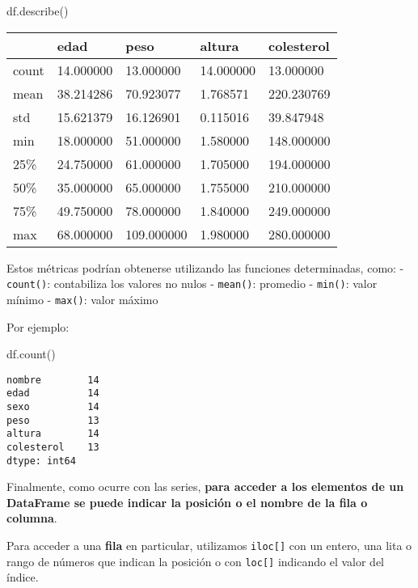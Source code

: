 \documentclass[
  letterpaper,
  DIV=11,
  numbers=noendperiod]{scrreprt}
\newenvironment{Shaded}{\begin{snugshade}}{\end{snugshade}}
\newcommand{\NormalTok}[1]{\textcolor[rgb]{0.00,0.23,0.31}{#1}}
\begin{document}
\begin{Shaded}
\begin{Highlighting}[]
\NormalTok{df.describe()}
\end{Highlighting}
\end{Shaded}

\begin{longtable}[]{@{}lllll@{}}
\toprule\noalign{}
& edad & peso & altura & colesterol \\
\midrule\noalign{}
\endhead
\bottomrule\noalign{}
\endlastfoot
count & 14.000000 & 13.000000 & 14.000000 & 13.000000 \\
mean & 38.214286 & 70.923077 & 1.768571 & 220.230769 \\
std & 15.621379 & 16.126901 & 0.115016 & 39.847948 \\
min & 18.000000 & 51.000000 & 1.580000 & 148.000000 \\
25\% & 24.750000 & 61.000000 & 1.705000 & 194.000000 \\
50\% & 35.000000 & 65.000000 & 1.755000 & 210.000000 \\
75\% & 49.750000 & 78.000000 & 1.840000 & 249.000000 \\
max & 68.000000 & 109.000000 & 1.980000 & 280.000000 \\
\end{longtable}

Estos métricas podrían obtenerse utilizando las funciones determinadas,
como: - \texttt{count()}: contabiliza los valores no nulos -
\texttt{mean()}: promedio - \texttt{min()}: valor mínimo -
\texttt{max()}: valor máximo

Por ejemplo:

\begin{Shaded}
\begin{Highlighting}[]
\NormalTok{df.count()}
\end{Highlighting}
\end{Shaded}

\begin{verbatim}
nombre        14
edad          14
sexo          14
peso          13
altura        14
colesterol    13
dtype: int64
\end{verbatim}

Finalmente, como ocurre con las series, \textbf{para acceder a los
elementos de un DataFrame se puede indicar la posición o el nombre de la
fila o columna}.

Para acceder a una \textbf{fila} en particular, utilizamos
\texttt{iloc{[}{]}} con un entero, una lita o rango de números que
indican la posición o con \texttt{loc{[}{]}} indicando el valor del
índice.
\end{document}
